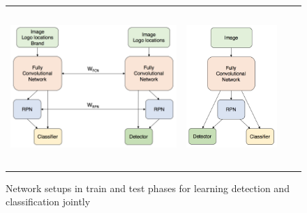 \begin{figure}
  \centering
\begin{tabular}{cccc}
  \includegraphics[height=60mm]{images/mt/siamtrain.png} &   \includegraphics[height=60mm]{images/mt/siamtest.png}
\end{tabular}
\caption{Network setups in train and test phases for learning detection and classification jointly}
\label{f:jointlearning}
\end{figure}
\bigbreak

